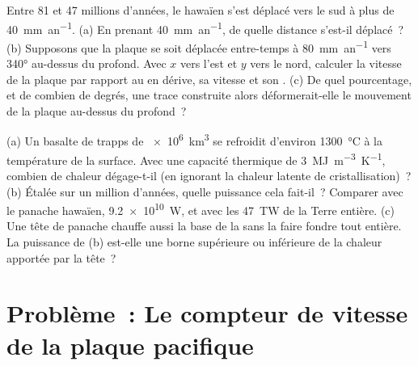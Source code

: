 \begin{exercise}[$\star\star\star$]\label{exo:b1:hotspots:11}
Entre 81 et 47 millions d'années, le  hawaïen s'est déplacé vers le sud à plus
de \qty{40}{mm.an^{-1}}. (a) En prenant \qty{40}{mm.an^{-1}}, de quelle distance
s'est-il déplacé~?
(b) Supposons que la plaque se soit déplacée entre-temps à \qty{80}{mm.an^{-1}} vers
\ang{340} au-dessus du  profond. Avec $x$ vers l'est et $y$ vers le nord, calculer la
vitesse de la plaque par rapport au  en dérive, sa vitesse et son
. (c) De quel pourcentage, et de combien de degrés, une trace construite
alors déformerait-elle le mouvement de la plaque au-dessus du  profond~?
\end{exercise}

\begin{exercise}[$\star\star\star$]\label{exo:b1:hotspots:12}
(a) Un basalte de trapps de \qty{e6}{km^3} se refroidit d'environ \qty{1300}{\celsius} à
la température de la surface. Avec une capacité thermique de \qty{3}{MJ.m^{-3}.K^{-1}},
combien de chaleur dégage-t-il (en ignorant la chaleur latente de cristallisation)~?
(b) Étalée sur un million d'années, quelle puissance cela fait-il~? Comparer avec le
panache hawaïen, \qty{9.2e10}{W}, et avec les \qty{47}{TW} de la Terre entière.
(c) Une tête de panache chauffe aussi la base de la  sans la faire fondre tout
entière. La puissance de (b) est-elle une borne supérieure ou inférieure de la chaleur apportée par la
tête~?
\end{exercise}

\section{Problème~: Le compteur de vitesse de la plaque pacifique}


